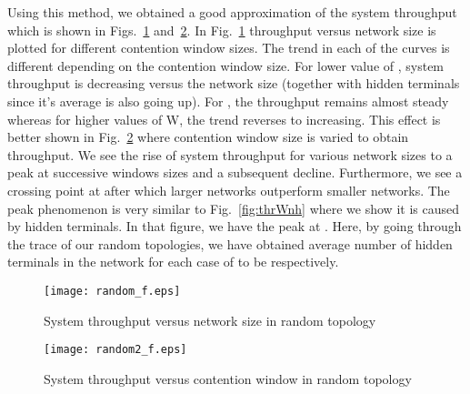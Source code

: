 \documentclass[10pt,journal,cspaper,compsoc]{IEEEtran}
\begin{document}
Using this method, we obtained a good approximation of the system throughput  which is shown in Figs.~\ref{fig:random1} and~\ref{fig:random2}. 
In Fig.~\ref{fig:random1} throughput versus network size is plotted for different contention window sizes. The trend in each of the curves is different depending on the contention window size. For lower value of , system throughput is decreasing versus the network size (together with hidden terminals since it's average is also going up). For , the throughput remains almost steady whereas for higher values of W, the trend reverses to increasing. This effect is better shown in Fig.~\ref{fig:random2} where contention window size is varied to obtain throughput. We see the rise of system throughput for various network sizes to a peak at successive windows sizes and a subsequent decline. Furthermore, we see a crossing point at  after which larger networks outperform smaller networks. The peak phenomenon is very similar to Fig.~\ref{fig:thrWnh} where we show it is caused by hidden terminals. In that figure, we have the peak  at . Here, by going through the trace of our random topologies, we have obtained average number of hidden terminals in the network for each case of  to be  respectively. 


\begin{figure}[!t]
	\centering
	\texttt{[image: random\_f.eps]}
	\caption{System throughput versus network size in random topology}
	\label{fig:random1}
\end{figure} 

\begin{figure}[!t]
	\centering
	\texttt{[image: random2\_f.eps]}
	\caption{System throughput versus contention window in random topology}
	\label{fig:random2}
\end{figure} 



\normalsize
\end{document}
